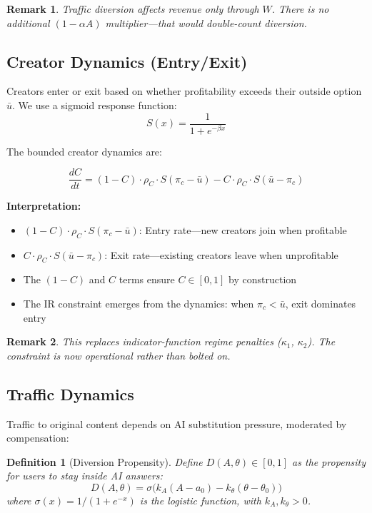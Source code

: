 \documentclass[11pt,a4paper]{article}
\newtheorem{definition}{Definition}
\newtheorem{remark}{Remark}
\begin{document}
\begin{remark}
Traffic diversion affects revenue \emph{only} through $W$. There is no additional $(1-\alpha A)$ multiplier---that would double-count diversion.
\end{remark}

\subsection{Creator Dynamics (Entry/Exit)}

Creators enter or exit based on whether profitability exceeds their outside option $\bar{u}$. We use a sigmoid response function:
\begin{equation}
S(x) = \frac{1}{1 + e^{-\beta x}}
\end{equation}

The bounded creator dynamics are:

\begin{equation}
\boxed{
\frac{dC}{dt} = (1-C) \cdot \rho_C \cdot S(\pi_c - \bar{u}) - C \cdot \rho_C \cdot S(\bar{u} - \pi_c)
}
\end{equation}

\textbf{Interpretation:}
\begin{itemize}
    \item $(1-C) \cdot \rho_C \cdot S(\pi_c - \bar{u})$: Entry rate---new creators join when profitable
    \item $C \cdot \rho_C \cdot S(\bar{u} - \pi_c)$: Exit rate---existing creators leave when unprofitable
    \item The $(1-C)$ and $C$ terms ensure $C \in [0,1]$ by construction
    \item The IR constraint emerges from the dynamics: when $\pi_c < \bar{u}$, exit dominates entry
\end{itemize}

\begin{remark}
This replaces indicator-function regime penalties ($\kappa_1$, $\kappa_2$). The constraint is now \emph{operational} rather than bolted on.
\end{remark}

\subsection{Traffic Dynamics}

Traffic to original content depends on AI substitution pressure, moderated by compensation:

\begin{definition}[Diversion Propensity]
Define $D(A, \theta) \in [0,1]$ as the propensity for users to stay inside AI answers:
\begin{equation}
D(A, \theta) = \sigma\Big(k_A(A - a_0) - k_\theta(\theta - \theta_0)\Big)
\end{equation}
where $\sigma(x) = 1/(1+e^{-x})$ is the logistic function, with $k_A, k_\theta > 0$.
\end{definition}
\end{document}
